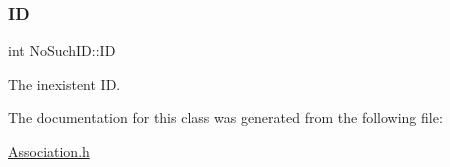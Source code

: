 \subsubsection{\texorpdfstring{ID}{ID}}
{\footnotesize\ttfamily int No\+Such\+I\+D\+::\+ID\hspace{0.3cm}{\ttfamily [private]}}



The inexistent ID. 



The documentation for this class was generated from the following file\+:\begin{DoxyCompactItemize}
\item 
\mbox{\hyperlink{Association_8h}{Association.\+h}}\end{DoxyCompactItemize}
